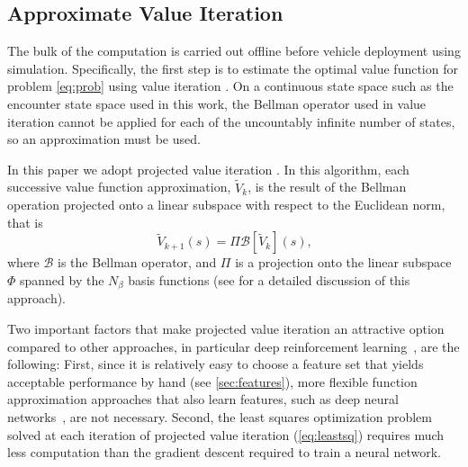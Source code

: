 \subsection{Approximate Value Iteration} \label{sec:iter}

The bulk of the computation is carried out offline before vehicle deployment using simulation. Specifically, the first step is to estimate the optimal value function for problem \eqref{eq:prob} using value iteration \cite{DB:05}. On a continuous state space such as the encounter state space used in this work, the Bellman operator used in value iteration cannot be applied for each of the uncountably infinite number of states, so an approximation must be used.

In this paper we adopt projected value iteration \cite{DB:05}. 
In this algorithm, each successive value function approximation, $\tilde{V}_k$, is the result of the Bellman operation projected onto a linear subspace with respect to the Euclidean norm, that is
\begin{equation}\label{eqn:projvi}
    \tilde{V}_{k+1}(s) = \Pi \mathcal{B}[\tilde{V}_k](s) \text{,}
\end{equation}
where $\mathcal{B}$ is the Bellman operator, and $\Pi$ is a projection onto the linear subspace $\Phi$ spanned by the $N_\beta$ basis functions (see \cite{DB:05} for a detailed discussion of this approach).

Two important factors that make projected value iteration an attractive option compared to other approaches, in particular deep reinforcement learning~\cite{mnih2015human}, are the following:
First, since it is relatively easy to choose a feature set that yields acceptable performance by hand (see \cref{sec:features}), more flexible function approximation approaches that also learn features, such as deep neural networks~\cite{goodfellow2016deep}, are not necessary.
Second, the least squares optimization problem solved at each iteration of projected value iteration (\ref{eq:leastsq}) requires much less computation than the gradient descent required to train a neural network.

